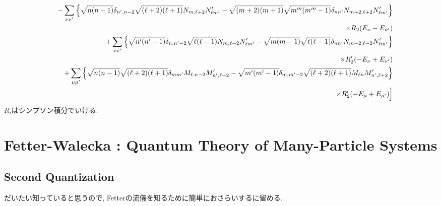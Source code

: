 \documentclass[10.5pt,a4paper]{jreport}
\begin{document}
\begin{eqnarray}
    \nonumber &&- \sum_{\nu\nu'}\Bqty{\sqrt{n(n-1)}\delta_{n', n-2}\sqrt{(\ell +2)(\ell +1)}N_{m, \ell +2}N_{\ell m'}' - \sqrt{(m+2)(m+1)}\sqrt{m'''(m'''-1)}\delta_{nn'}N_{m+2, \ell +2}N_{\ell m'}'}\\
    \nonumber&&\hspace{14cm}\times R_2(E_\nu - E_{\nu'})\\
    \nonumber &&+ \sum_{\nu\nu'}\Bqty{\sqrt{n'(n'-1)}\delta_{n, n'-2}\sqrt{\ell (\ell -1)}N_{m, \ell -2}N_{\ell m'}' - \sqrt{m(m-1)}\sqrt{\ell (\ell -1)}\delta_{nn'}N_{m-2, \ell -2}N_{\ell m'}'}\\
    \nonumber&&\hspace{14cm}\times R_2'(-E_\nu + E_{\nu'})\\
    \nonumber&&+\sum_{\mu\mu'}\Bqty{\sqrt{n(n-1)}\sqrt{(\ell +2)(\ell +1)}\delta_{mm'}M_{\ell , n-2}M_{n', \ell +2}' - \sqrt{m'(m'-1)}\delta_{m, m'-2}\sqrt{(\ell +2)(\ell +1)}M_{\ell n}M_{n', \ell +2}'}\\
    \nonumber&&\hspace{14cm}\times R_2'(- E_\mu + E_{\mu'})\Bigr]\\
\end{eqnarray}
$R_i$はシンプソン積分でいける.
\newpage
\chapter{Fetter-Walecka : Quantum Theory of Many-Particle Systems}
\section{Second Quantization}
だいたい知っていると思うので, Fetterの流儀を知るために簡単におさらいするに留める.
\end{document}
